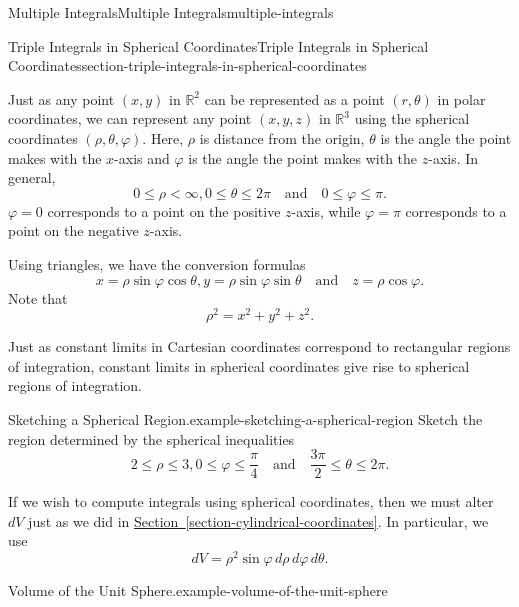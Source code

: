 \documentclass[oneside,10pt,]{book}
\numberwithin{equation}{section}
\newcommand{\qq}[1]{\quad\text{#1}\quad}
\newcommand{\lt}{<}
\begin{document}
\begin{chapterptx}{Multiple Integrals}{}{Multiple Integrals}{}{}{multiple-integrals}
\begin{sectionptx}{Triple Integrals in Spherical Coordinates}{}{Triple Integrals in Spherical Coordinates}{}{}{section-triple-integrals-in-spherical-coordinates}
\par
\hypertarget{p-1532}{}%
Just as any point \((x,y)\) in \(\mathbb{R}^{2}\) can be represented as a point \((r,\theta)\) in polar coordinates, we can represent any point \((x,y,z)\) in \(\mathbb{R}^{3}\) using the spherical coordinates \((\rho, \theta,\varphi)\). Here, \(\rho\) is distance from the origin, \(\theta\) is the angle the point makes with the \(x\)-axis and \(\varphi\) is the angle the point makes with the \(z\)-axis. In general,%
\begin{equation*}
0\leq\rho\lt\infty, 0\leq\theta\leq2\pi\qq{and} 0\leq \varphi\leq \pi\text{.}
\end{equation*}
\(\varphi = 0\) corresponds to a point on the positive \(z\)-axis, while \(\varphi = \pi\) corresponds to a point on the negative \(z\)-axis.%
\par
\hypertarget{p-1533}{}%
Using triangles, we have the conversion formulas%
\begin{equation*}
x = \rho\sin\varphi\cos\theta, y = \rho\sin\varphi\sin\theta\qq{and} z = \rho\cos\varphi\text{.}
\end{equation*}
Note that%
\begin{equation*}
\rho^{2} = x^{2} + y^{2} + z^{2}\text{.}
\end{equation*}
%
\par
\hypertarget{p-1534}{}%
Just as constant limits in Cartesian coordinates correspond to rectangular regions of integration, constant limits in spherical coordinates give rise to spherical regions of integration.%
\begin{example}{Sketching a Spherical Region.}{example-sketching-a-spherical-region}%
\hypertarget{p-1535}{}%
Sketch the region determined by the spherical inequalities%
\begin{equation*}
2\leq \rho\leq 3, 0\leq \varphi\leq \frac{\pi}{4} \qq{and} \frac{3\pi}{2}\leq \theta\leq 2\pi\text{.}
\end{equation*}
%
\end{example}
\hypertarget{p-1536}{}%
If we wish to compute integrals using spherical coordinates, then we must alter \(dV\) just as we did in \hyperref[section-cylindrical-coordinates]{Section~\ref{section-cylindrical-coordinates}}. In particular, we use%
\begin{equation*}
dV = \rho^{2}\sin\varphi\,d\rho\,d\varphi\,d\theta\text{.}
\end{equation*}
%
\begin{example}{Volume of the Unit Sphere.}{example-volume-of-the-unit-sphere}%

\end{example}
\end{sectionptx}
\end{chapterptx}
\end{document}
